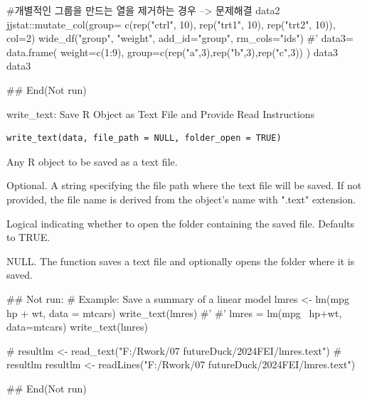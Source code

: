 \documentclass[a4paper]{book}
\begin{document}
\begin{Examples}
\begin{ExampleCode}
#개별적인 그룹을 만드는 열을 제거하는 경우 --> 문제해결
data2 %
  jjstat::mutate_col(group= c(rep("ctrl", 10),
  rep("trt1", 10), rep("trt2", 10)),  col=2)%
  wide_df("group", "weight", add_id="group", rm_cols="ids") %
#'
data3= data.frame(
  weight=c(1:9),
  group=c(rep("a",3),rep("b",3),rep("c",3))
)
data3
data3 %

## End(Not run)

\end{ExampleCode}
\end{Examples}

%
\begin{Description}
write\_text: Save R Object as Text File and Provide Read Instructions
\end{Description}
%
\begin{Usage}
\begin{verbatim}
write_text(data, file_path = NULL, folder_open = TRUE)
\end{verbatim}
\end{Usage}
%
\begin{Arguments}
\begin{ldescription}
\item[\code{data}] Any R object to be saved as a text file.

\item[\code{file\_path}] Optional. A string specifying the file path where the text file will be saved.
If not provided, the file name is derived from the object's name with ".text" extension.

\item[\code{folder\_open}] Logical indicating whether to open the folder containing the saved file. Defaults to TRUE.
\end{ldescription}
\end{Arguments}
%
\begin{Value}
NULL. The function saves a text file and optionally opens the folder where it is saved.
\end{Value}
%
\begin{Examples}
\begin{ExampleCode}
\#\# Not run: 
# Example: Save a summary of a linear model
lmres <- lm(mpg ~ hp + wt, data = mtcars) %
write_text(lmres)
#'
#'
lmres = lm(mpg~ hp+wt, data=mtcars) %
write_text(lmres)

# resultlm <- read_text("F:/Rwork/07 futureDuck/2024FEI/lmres.text")
# resultlm
resultlm <- readLines("F:/Rwork/07 futureDuck/2024FEI/lmres.text")



## End(Not run)
\end{ExampleCode}
\end{Examples}
\end{document}
